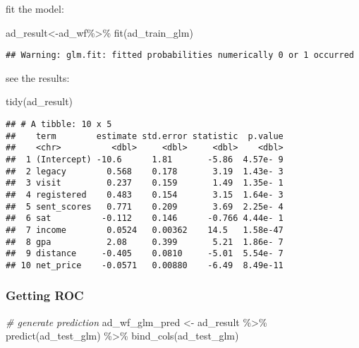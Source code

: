 \documentclass[
]{article}
\newenvironment{Shaded}{\begin{snugshade}}{\end{snugshade}}
\newcommand{\CommentTok}[1]{\textcolor[rgb]{0.56,0.35,0.01}{\textit{#1}}}
\newcommand{\FunctionTok}[1]{\textcolor[rgb]{0.00,0.00,0.00}{#1}}
\newcommand{\NormalTok}[1]{#1}
\newcommand{\OtherTok}[1]{\textcolor[rgb]{0.56,0.35,0.01}{#1}}
\newcommand{\SpecialCharTok}[1]{\textcolor[rgb]{0.00,0.00,0.00}{#1}}
\begin{document}
fit the model:

\begin{Shaded}
\begin{Highlighting}[]
\NormalTok{ad\_result}\OtherTok{\textless{}{-}}\NormalTok{ad\_wf}\SpecialCharTok{\%\textgreater{}\%}
  \FunctionTok{fit}\NormalTok{(ad\_train\_glm)}
\end{Highlighting}
\end{Shaded}

\begin{verbatim}
## Warning: glm.fit: fitted probabilities numerically 0 or 1 occurred
\end{verbatim}

see the results:

\begin{Shaded}
\begin{Highlighting}[]
\FunctionTok{tidy}\NormalTok{(ad\_result)}
\end{Highlighting}
\end{Shaded}

\begin{verbatim}
## # A tibble: 10 x 5
##    term        estimate std.error statistic  p.value
##    <chr>          <dbl>     <dbl>     <dbl>    <dbl>
##  1 (Intercept) -10.6      1.81       -5.86  4.57e- 9
##  2 legacy        0.568    0.178       3.19  1.43e- 3
##  3 visit         0.237    0.159       1.49  1.35e- 1
##  4 registered    0.483    0.154       3.15  1.64e- 3
##  5 sent_scores   0.771    0.209       3.69  2.25e- 4
##  6 sat          -0.112    0.146      -0.766 4.44e- 1
##  7 income        0.0524   0.00362    14.5   1.58e-47
##  8 gpa           2.08     0.399       5.21  1.86e- 7
##  9 distance     -0.405    0.0810     -5.01  5.54e- 7
## 10 net_price    -0.0571   0.00880    -6.49  8.49e-11
\end{verbatim}

\hypertarget{getting-roc-1}{%
\subsubsection{Getting ROC}\label{getting-roc-1}}

\begin{Shaded}
\begin{Highlighting}[]
\CommentTok{\# generate prediction}
\NormalTok{ad\_wf\_glm\_pred }\OtherTok{\textless{}{-}}\NormalTok{ ad\_result }\SpecialCharTok{\%\textgreater{}\%}
  \FunctionTok{predict}\NormalTok{(ad\_test\_glm) }\SpecialCharTok{\%\textgreater{}\%}
  \FunctionTok{bind\_cols}\NormalTok{(ad\_test\_glm)}
\end{Highlighting}
\end{Shaded}
\end{document}
